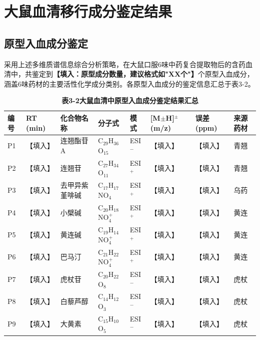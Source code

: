 \documentclass[12pt,a4paper,UTF8,openany]{ctexbook}
\begin{document}
\section{大鼠血清移行成分鉴定结果}

\subsection{原型入血成分鉴定}

采用上述多维质谱信息综合分析策略，在大鼠口服6味中药复合提取物后的含药血清中，共鉴定到\textbf{【填入：原型成分数量，建议格式如"XX个"】}个原型入血成分，涵盖6味药材的主要活性化学成分类别。各原型入血成分的鉴定信息汇总于表3-2。

\begin{table}[H]
\centering
\caption{\textbf{表3-2\enspace 大鼠血清中原型入血成分鉴定结果汇总}}
\label{tab:prototype_components}
\small
\begin{tabularx}{\textwidth}{>{\centering\arraybackslash}p{0.5cm} >{\centering\arraybackslash}p{1.0cm} >{\raggedright\arraybackslash}p{3.2cm} >{\raggedright\arraybackslash}p{2.0cm} >{\centering\arraybackslash}p{0.9cm} >{\centering\arraybackslash}p{1.6cm} >{\raggedright\arraybackslash}p{1.0cm} >{\raggedright\arraybackslash}X}
\toprule
\textbf{编号} & \textbf{RT (min)} & \textbf{化合物名称} & \textbf{分子式} & \textbf{模式} & \textbf{[M$\pm$H]$^\pm$ (m/z)} & \textbf{误差 (ppm)} & \textbf{来源药材} \\
\midrule
P1 & 【填入】 & 连翘酯苷A & C$_{29}$H$_{36}$O$_{15}$ & ESI$^-$ & 【填入】 & 【填入】 & 青翘 \\
P2 & 【填入】 & 连翘苷 & C$_{27}$H$_{34}$O$_{11}$ & ESI$^+$ & 【填入】 & 【填入】 & 青翘 \\
P3 & 【填入】 & 去甲异紫堇啡碱 & C$_{17}$H$_{17}$NO$_4$ & ESI$^+$ & 【填入】 & 【填入】 & 乌药 \\
P4 & 【填入】 & 小檗碱 & C$_{20}$H$_{18}$NO$_4^+$ & ESI$^+$ & 【填入】 & 【填入】 & 黄连 \\
P5 & 【填入】 & 黄连碱 & C$_{19}$H$_{14}$NO$_4^+$ & ESI$^+$ & 【填入】 & 【填入】 & 黄连 \\
P6 & 【填入】 & 巴马汀 & C$_{21}$H$_{22}$NO$_4^+$ & ESI$^+$ & 【填入】 & 【填入】 & 黄连 \\
P7 & 【填入】 & 虎杖苷 & C$_{20}$H$_{22}$O$_8$ & ESI$^-$ & 【填入】 & 【填入】 & 虎杖 \\
P8 & 【填入】 & 白藜芦醇 & C$_{14}$H$_{12}$O$_3$ & ESI$^-$ & 【填入】 & 【填入】 & 虎杖 \\
P9 & 【填入】 & 大黄素 & C$_{15}$H$_{10}$O$_5$ & ESI$^-$ & 【填入】 & 【填入】 & 虎杖 \\

\end{tabularx}
\end{table}
\end{document}
